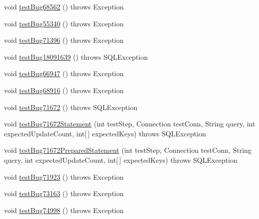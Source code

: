 \begin{DoxyCompactItemize}
\item 
void \mbox{\hyperlink{classtestsuite_1_1regression_1_1_statement_regression_test_a98f77aa1cdaf8554dcfff5b368c4e90a}{test\+Bug68562}} ()  throws Exception 
\item 
void \mbox{\hyperlink{classtestsuite_1_1regression_1_1_statement_regression_test_ad893290c719e6320a980acdd172851e7}{test\+Bug55340}} ()  throws Exception 
\item 
void \mbox{\hyperlink{classtestsuite_1_1regression_1_1_statement_regression_test_a716338573789cf539312a6527ddd2ea6}{test\+Bug71396}} ()  throws Exception 
\item 
void \mbox{\hyperlink{classtestsuite_1_1regression_1_1_statement_regression_test_a01b6dcfb6870df0348d9c1fb80efe81c}{test\+Bug18091639}} ()  throws S\+Q\+L\+Exception 
\item 
void \mbox{\hyperlink{classtestsuite_1_1regression_1_1_statement_regression_test_a222cfacd79b9dcf61c6ebefe3966ede7}{test\+Bug66947}} ()  throws Exception 
\item 
void \mbox{\hyperlink{classtestsuite_1_1regression_1_1_statement_regression_test_a23f5d3d3b8c4eb0019effe8aadd4b4b2}{test\+Bug68916}} ()  throws Exception 
\item 
void \mbox{\hyperlink{classtestsuite_1_1regression_1_1_statement_regression_test_ab1d12cefc8598fc6b119554ddfe01866}{test\+Bug71672}} ()  throws S\+Q\+L\+Exception 
\item 
void \mbox{\hyperlink{classtestsuite_1_1regression_1_1_statement_regression_test_abb13639717a457989454d73d4dbc02b8}{test\+Bug71672\+Statement}} (int test\+Step, Connection test\+Conn, String query, int expected\+Update\+Count, int\mbox{[}$\,$\mbox{]} expected\+Keys)  throws S\+Q\+L\+Exception 
\item 
void \mbox{\hyperlink{classtestsuite_1_1regression_1_1_statement_regression_test_ac89b52220f4a7d1e808940f72f5887c1}{test\+Bug71672\+Prepared\+Statement}} (int test\+Step, Connection test\+Conn, String query, int expected\+Update\+Count, int\mbox{[}$\,$\mbox{]} expected\+Keys)  throws S\+Q\+L\+Exception 
\item 
void \mbox{\hyperlink{classtestsuite_1_1regression_1_1_statement_regression_test_a3676f906ace9714006ad7a71ab1e4211}{test\+Bug71923}} ()  throws Exception 
\item 
void \mbox{\hyperlink{classtestsuite_1_1regression_1_1_statement_regression_test_ae5f07756a16c505fbd7fb497fcf9f601}{test\+Bug73163}} ()  throws Exception 
\item 
void \mbox{\hyperlink{classtestsuite_1_1regression_1_1_statement_regression_test_a785d6999de84a7868d85817387113884}{test\+Bug74998}} ()  throws Exception 

\end{DoxyCompactItemize}
